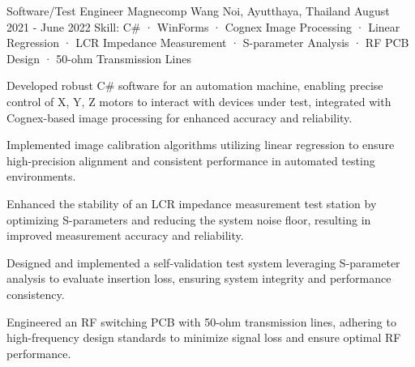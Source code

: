 \begin{cventries}
  \cventry
    {Software/Test Engineer} %
    {Magnecomp} %
    {Wang Noi, Ayutthaya, Thailand} %
    {August 2021 - June 2022} %
    {Skill: C\# · WinForms · Cognex Image Processing · Linear Regression · LCR Impedance Measurement · S-parameter Analysis · RF PCB Design · 50-ohm Transmission Lines} %
    {
      \begin{cvitems} %
      \item {Developed robust C\# software for an automation machine, enabling precise control of X, Y, Z motors to interact with devices under test, integrated with Cognex-based image processing for enhanced accuracy and reliability.}
      \item {Implemented image calibration algorithms utilizing linear regression to ensure high-precision alignment and consistent performance in automated testing environments.}
      \item {Enhanced the stability of an LCR impedance measurement test station by optimizing S-parameters and reducing the system noise floor, resulting in improved measurement accuracy and reliability.}
      \item {Designed and implemented a self-validation test system leveraging S-parameter analysis to evaluate insertion loss, ensuring system integrity and performance consistency.}
      \item {Engineered an RF switching PCB with 50-ohm transmission lines, adhering to high-frequency design standards to minimize signal loss and ensure optimal RF performance.}
      \end{cvitems}
    }


\end{cventries}
